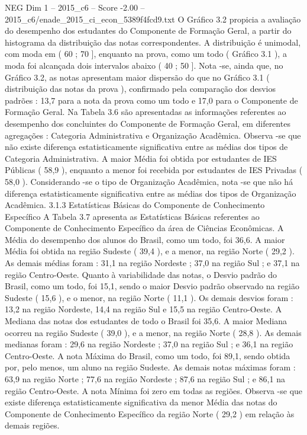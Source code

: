\begin{textsample}{NEG Dim 1 – 2015\_c6 – Score -2.00 – 2015\_c6/enade\_2015\_ci\_econ\_5389f4fcd9.txt}
O Gráfico 3.2 propicia a avaliação do desempenho dos estudantes do Componente de Formação Geral, a partir do histograma da distribuição das notas correspondentes.
A distribuição é unimodal, com moda em ( 60 ; 70 ], enquanto na prova, como um todo ( Gráfico 3.1 ), a moda foi alcançada dois intervalos abaixo ( 40 ; 50 ].
Nota -se, ainda que, no Gráfico 3.2, as notas apresentam maior dispersão do que no Gráfico 3.1 ( distribuição das notas da prova ), confirmado pela comparação dos desvios padrões : 13,7 para a nota da prova como um todo e 17,0 para o Componente de Formação Geral.
Na Tabela 3.6 são apresentadas as informações referentes ao desempenho dos concluintes do Componente de Formação Geral, em diferentes agregações : Categoria Administrativa e Organização Acadêmica.
Observa -se que não existe diferença estatisticamente significativa entre as médias dos tipos de Categoria Administrativa.
A maior Média foi obtida por estudantes de IES Públicas ( 58,9 ), enquanto a menor foi recebida por estudantes de IES Privadas ( 58,0 ).
Considerando -se o tipo de Organização Acadêmica, nota -se que não há diferença estatisticamente significativa entre as médias dos tipos de Organização Acadêmica. 3.1.3 Estatísticas Básicas do Componente de Conhecimento Específico A Tabela 3.7 apresenta as Estatísticas Básicas referentes ao Componente de Conhecimento Específico da área de Ciências Econômicas.
A Média do desempenho dos alunos do Brasil, como um todo, foi 36,6.
A maior Média foi obtida na região Sudeste ( 39,4 ), e a menor, na região Norte ( 29,2 ).
As demais médias foram : 31,1 na região Nordeste ; 37,0 na região Sul ; e 37,1 na região Centro-Oeste.
Quanto à variabilidade das notas, o Desvio padrão do Brasil, como um todo, foi 15,1, sendo o maior Desvio padrão observado na região Sudeste ( 15,6 ), e o menor, na região Norte ( 11,1 ).
Os demais desvios foram : 13,2 na região Nordeste, 14,4 na região Sul e 15,5 na região Centro-Oeste.
A Mediana das notas dos estudantes de todo o Brasil foi 35,6.
A maior Mediana ocorreu na região Sudeste ( 39,0 ), e a menor, na região Norte ( 28,8 ).
As demais medianas foram : 29,6 na região Nordeste ; 37,0 na região Sul ; e 36,1 na região Centro-Oeste.
A nota Máxima do Brasil, como um todo, foi 89,1, sendo obtida por, pelo menos, um aluno na região Sudeste.
As demais notas máximas foram : 63,9 na região Norte ; 77,6 na região Nordeste ; 87,6 na região Sul ; e 86,1 na região Centro-Oeste.
A nota Mínima foi zero em todas as regiões.
Observa -se que existe diferença estatisticamente significativa da menor Média das notas do Componente de Conhecimento Específico da região Norte ( 29,2 ) em relação às demais regiões.

\end{textsample}

